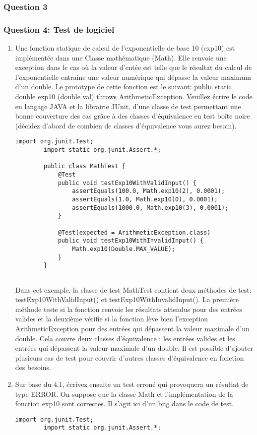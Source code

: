 \subsubsection{Question 3}

\newpage
\subsubsection{Question 4: Test de logiciel}
\begin{enumerate}
	\item Une fonction statique de calcul de l'exponentielle de base 10 (exp10) est implémentée dans une Classe mathématique (Math). Elle renvoie une exception dans le cas où la valeur d'entée est telle que le résultat du calcul de l'exponentielle entraine une valeur numérique qui dépasse la valeur maximum d'un double. Le prototype de cette fonction est le suivant:
	public static double exp10 (double val) throws
	ArithmeticException.
	Veuillez écrire le code en langage JAVA et la librairie JUnit, d'une classe de test permettant une bonne couverture des cas grâce à des classes d'équivalence en test boîte noire (décidez d'abord de combien de classes d'équivalence vous aurez besoin).
	\begin{lstlisting}[style=monstyle]
		import org.junit.Test;
		import static org.junit.Assert.*;
		
		public class MathTest {
			@Test
			public void testExp10WithValidInput() {
				assertEquals(100.0, Math.exp10(2), 0.0001);
				assertEquals(1.0, Math.exp10(0), 0.0001);
				assertEquals(1000.0, Math.exp10(3), 0.0001);
			}
			
			@Test(expected = ArithmeticException.class)
			public void testExp10WithInvalidInput() {
				Math.exp10(Double.MAX_VALUE);
			}
		}
		
	\end{lstlisting}
Dans cet exemple, la classe de test MathTest contient deux méthodes de test: testExp10WithValidInput() et testExp10WithInvalidInput(). La première méthode teste si la fonction renvoie les résultats attendus pour des entrées valides et la deuxième vérifie si la fonction lève bien l'exception ArithmeticException pour des entrées qui dépassent la valeur maximale d'un double. Cela couvre deux classes d'équivalence : les entrées valides et les entrées qui dépassent la valeur maximale d'un double.
Il est possible d'ajouter plusieurs cas de test pour couvrir d'autres classes d'équivalence en fonction des besoins.

	\item Sur base du 4.1, écrivez ensuite un test erroné qui provoquera un résultat de type ERROR. On suppose que la classe Math et l'implémentation de la fonction exp10 sont correctes. Il s'agit ici d'un bug dans le code de test.
	\begin{lstlisting}[style=monstyle]
		import org.junit.Test;
		import static org.junit.Assert.*;
		

\end{lstlisting}
\end{enumerate}
